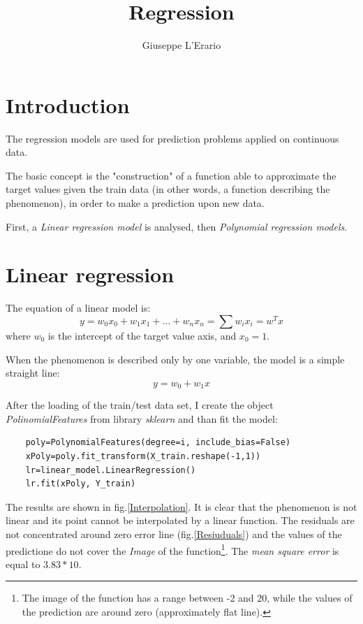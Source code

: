 \documentclass[10pt,a4paper]{article}
\author{Giuseppe L'Erario}
\date{}
\title{Regression}
\begin{document}
	\maketitle
	
	\section*{Introduction}
	The regression models are used for prediction problems applied on continuous data.
	
	The basic concept is the "construction" of a function able to approximate the target values given the train data (in other words, a function describing the phenomenon), in order to make a prediction upon new data.
	
	First, a \emph{Linear regression model} is analysed, then \emph{Polynomial regression models}.
	
	\section{Linear regression}
	The equation of a linear model is:
	\begin{equation}
		y = w_0 x_0 + w_1 x_1 + ... + w_n x_n = \sum w_i x_ i = w^{T} x
	\end{equation}
	where $w_0$ is the intercept of the target value axis, and $x_0=1$.
	
	When the phenomenon is described only by one variable, the model is a simple straight line:
	\begin{equation}
		y = w_0 + w_1 x
	\end{equation}
	
	After the loading of the train/test data set, I create the object \emph{PolinomialFeatures} from library \emph{sklearn} and than fit the model:
	\begin{Verbatim}
	poly=PolynomialFeatures(degree=i, include_bias=False)
	xPoly=poly.fit_transform(X_train.reshape(-1,1))
	lr=linear_model.LinearRegression()
	lr.fit(xPoly, Y_train)
	\end{Verbatim}
	
	The results are shown in fig.\ref{Interpolation}. It is clear that the phenomenon is not linear and its point cannot be interpolated by a linear function. The residuals are not concentrated around zero error line (fig.\ref{Resiuduals}) and the values of the predictione do not cover the \emph{Image} of the function\footnote{The image of the function has a range between -2 and 20, while the values of the prediction are around zero (approximately flat line).}. The \emph{mean square error} is equal to $3.83*10$.
	
\end{document}
